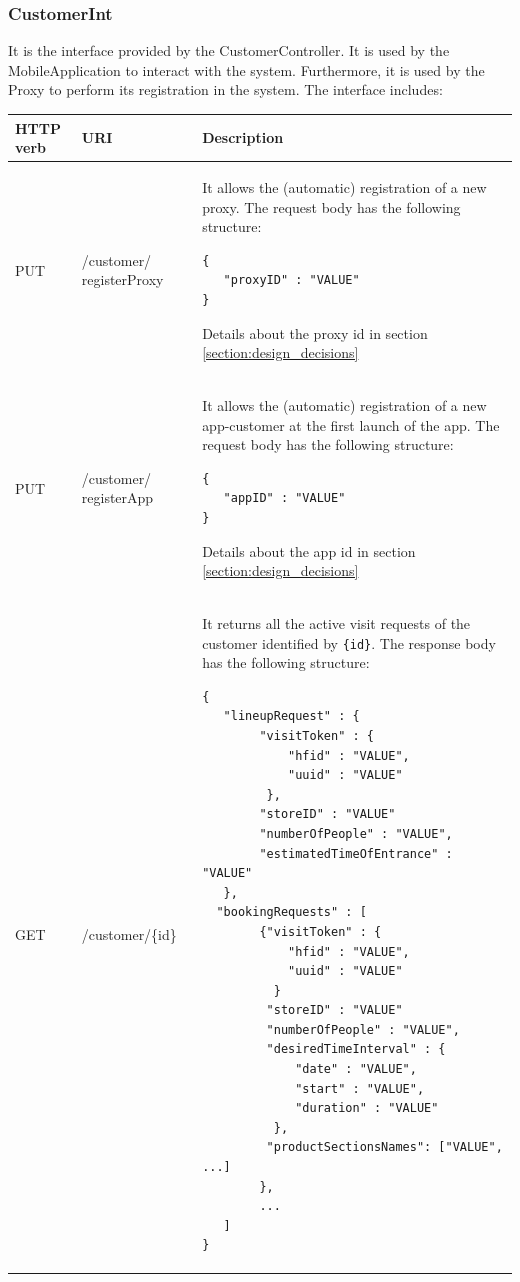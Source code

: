 \documentclass[a4paper,oneside,11pt]{book}
\begin{document}
    \subsubsection{CustomerInt}
    It is the interface provided by the CustomerController. It is used by the MobileApplication to interact with the system. Furthermore, it is used by the Proxy to perform its registration in the system. The interface includes:
    \newpage
    \begin{longtable}[c] { |>{\centering\arraybackslash}P{0.11\textwidth}|>{\centering\arraybackslash\ttfamily}H{0.23\textwidth}|H{0.50\textwidth}| }
        \hline
        \textbf{HTTP verb} & \textrm{\textbf{URI}} & \textbf{\textbf{Description}} \\ \hline
        PUT & /customer/ registerProxy & It allows the (automatic) registration of a new proxy. The request body has the following structure: 
        \begin{lstlisting}[language=jsonDD]
{
   "proxyID" : "VALUE"
}
        \end{lstlisting} Details about the proxy id in section \ref{section:design_decisions} \\ \hline
        PUT & /customer/ registerApp & It allows the (automatic) registration of a new app-customer at the first launch of the app. The request body has the following structure:
        \begin{lstlisting}[language=jsonDD]
{
   "appID" : "VALUE"
}
        \end{lstlisting} Details about the app id in section \ref{section:design_decisions} \\ \hline
        GET & /customer/\{id\} & It returns all the active visit requests of the customer identified by \texttt{\{id\}}. The response body has the following structure:
        \begin{lstlisting}[language=jsonDD]
{
   "lineupRequest" : {
        "visitToken" : {
            "hfid" : "VALUE",
            "uuid" : "VALUE"
         },
        "storeID" : "VALUE"
        "numberOfPeople" : "VALUE",
        "estimatedTimeOfEntrance" : "VALUE"
   },
  "bookingRequests" : [
        {"visitToken" : {
            "hfid" : "VALUE",
            "uuid" : "VALUE"
          }
         "storeID" : "VALUE"
         "numberOfPeople" : "VALUE",
         "desiredTimeInterval" : {
             "date" : "VALUE",
             "start" : "VALUE",
             "duration" : "VALUE"
          },
         "productSectionsNames": ["VALUE", ...]
        },
        ...
   ]
}
        \end{lstlisting} \\ \hline

\end{longtable}
\end{document}
